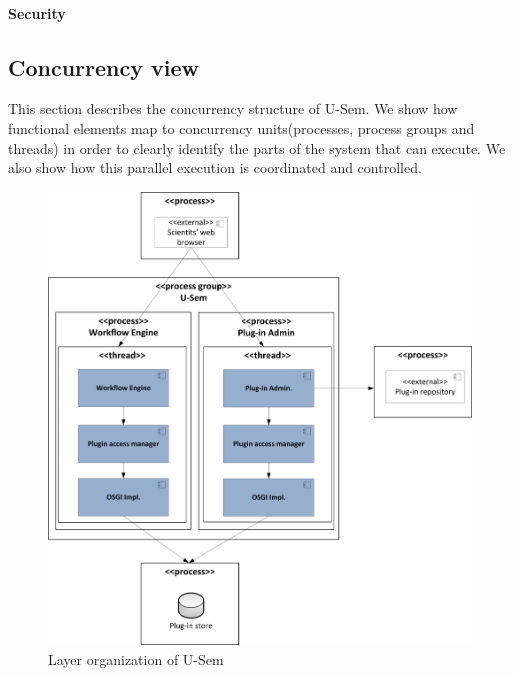 \paragraph{Security}

\subsection{Concurrency view}

This section describes the concurrency structure of U-Sem. We show how functional elements map to concurrency units(processes, process groups and threads) in order to clearly identify the parts of the system that can execute. We also show how this parallel execution is coordinated and controlled.

\begin{figure}[h!]
  \centering
  	\includegraphics[scale=0.70]{plug-in/layers/concur.png}
  \caption{Layer organization of U-Sem}
\end{figure}


